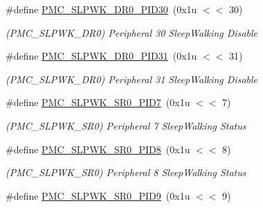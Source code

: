 \begin{DoxyCompactItemize}
\mbox{\label{group__SAMV71__PMC_gadb8361edd29501c31639b29d439a7442}} 
\#define \mbox{\hyperlink{group__SAMV71__PMC_gadb8361edd29501c31639b29d439a7442}{P\+M\+C\+\_\+\+S\+L\+P\+W\+K\+\_\+\+D\+R0\+\_\+\+P\+I\+D30}}~(0x1u $<$$<$ 30)
\begin{DoxyCompactList}\small\item\em (P\+M\+C\+\_\+\+S\+L\+P\+W\+K\+\_\+\+D\+R0) Peripheral 30 Sleep\+Walking Disable \end{DoxyCompactList}\item 
\mbox{\label{group__SAMV71__PMC_ga535a859388caa8385073eb68e7150bb7}} 
\#define \mbox{\hyperlink{group__SAMV71__PMC_ga535a859388caa8385073eb68e7150bb7}{P\+M\+C\+\_\+\+S\+L\+P\+W\+K\+\_\+\+D\+R0\+\_\+\+P\+I\+D31}}~(0x1u $<$$<$ 31)
\begin{DoxyCompactList}\small\item\em (P\+M\+C\+\_\+\+S\+L\+P\+W\+K\+\_\+\+D\+R0) Peripheral 31 Sleep\+Walking Disable \end{DoxyCompactList}\item 
\mbox{\label{group__SAMV71__PMC_ga6771914b09a260b40845efd5c09dc42b}} 
\#define \mbox{\hyperlink{group__SAMV71__PMC_ga6771914b09a260b40845efd5c09dc42b}{P\+M\+C\+\_\+\+S\+L\+P\+W\+K\+\_\+\+S\+R0\+\_\+\+P\+I\+D7}}~(0x1u $<$$<$ 7)
\begin{DoxyCompactList}\small\item\em (P\+M\+C\+\_\+\+S\+L\+P\+W\+K\+\_\+\+S\+R0) Peripheral 7 Sleep\+Walking Status \end{DoxyCompactList}\item 
\mbox{\label{group__SAMV71__PMC_gaf31c268accd1f5da86d29d6f74809f38}} 
\#define \mbox{\hyperlink{group__SAMV71__PMC_gaf31c268accd1f5da86d29d6f74809f38}{P\+M\+C\+\_\+\+S\+L\+P\+W\+K\+\_\+\+S\+R0\+\_\+\+P\+I\+D8}}~(0x1u $<$$<$ 8)
\begin{DoxyCompactList}\small\item\em (P\+M\+C\+\_\+\+S\+L\+P\+W\+K\+\_\+\+S\+R0) Peripheral 8 Sleep\+Walking Status \end{DoxyCompactList}\item 
\mbox{\label{group__SAMV71__PMC_ga39fb1a078476fd3389bf9b7b05295ba9}} 
\#define \mbox{\hyperlink{group__SAMV71__PMC_ga39fb1a078476fd3389bf9b7b05295ba9}{P\+M\+C\+\_\+\+S\+L\+P\+W\+K\+\_\+\+S\+R0\+\_\+\+P\+I\+D9}}~(0x1u $<$$<$ 9)
$$
\end{DoxyCompactItemize}
